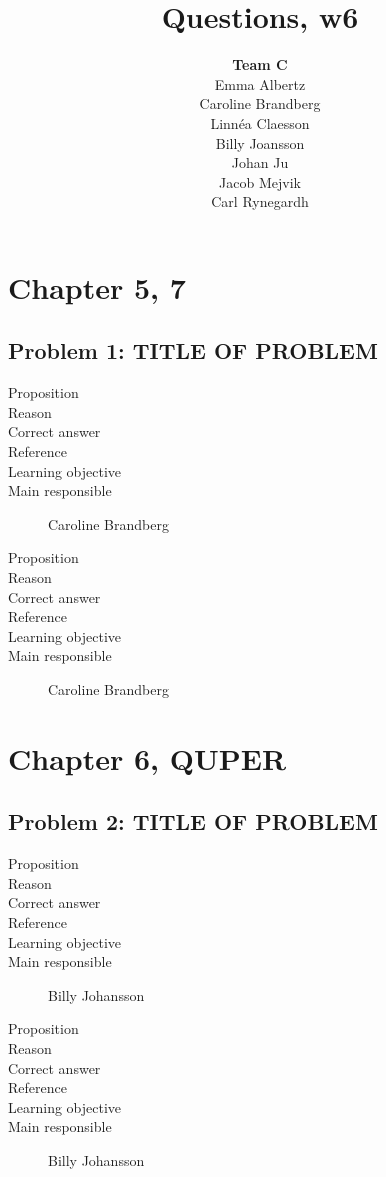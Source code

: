 \documentclass[10pt,a4paper]{article}
\title{Questions, w6}
\author{\textbf{Team C}\\
Emma Albertz\\
Caroline Brandberg\\
Linnéa Claesson\\
Billy Joansson\\
Johan Ju\\
Jacob Mejvik\\
Carl Rynegardh}
\begin{document}
\maketitle
\section*{Chapter 5, 7}
\subsection*{Problem 1: TITLE OF PROBLEM}
\begin{description}
\item[Proposition] 
\item[Reason] 
\item[Correct answer]
\item[Reference]
\item[Learning objective]
\item[Main responsible] Caroline Brandberg
\end{description}

\begin{description}
\item[Proposition] 
\item[Reason] 
\item[Correct answer]
\item[Reference]
\item[Learning objective]
\item[Main responsible] Caroline Brandberg
\end{description}

\section*{Chapter 6, QUPER}
\subsection*{Problem 2: TITLE OF PROBLEM}
\begin{description}
\item[Proposition] 
\item[Reason] 
\item[Correct answer]
\item[Reference]
\item[Learning objective]
\item[Main responsible] Billy Johansson
\end{description}

\begin{description}
\item[Proposition] 
\item[Reason] 
\item[Correct answer]
\item[Reference]
\item[Learning objective]
\item[Main responsible] Billy Johansson
\end{description}
\end{document}
